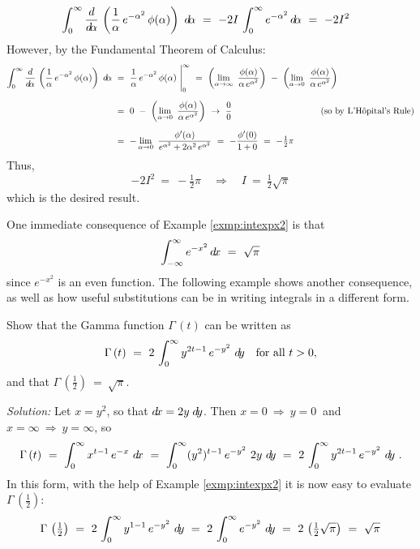 \begin{exmp}
\begin{align*}
&\int_0^{\infty} \frac{d}{d\!\alpha}\,\left(\frac{1}{\alpha}\,e^{-\alpha^2}\,\phi(\alpha)\right)~d\!\alpha ~=~
-2I\,\int_0^{\infty} e^{-\alpha^2} \,d\!\alpha ~=~ -2I^2
\end{align*}
However, by the Fundamental Theorem of Calculus:
\begin{align*}
\int_0^{\infty} \frac{d}{d\!\alpha}\,\left(\frac{1}{\alpha}\,e^{-\alpha^2}\,\phi(\alpha)\right)~d\!\alpha ~&=~
\frac{1}{\alpha}\,e^{-\alpha^2}\,\phi(\alpha)~\Biggr|_0^{\infty}
~=~ \left(\lim_{\alpha \to \infty}~\frac{\phi(\alpha)}{\alpha \,e^{\alpha^2}}\right) ~-~
    \left(\lim_{\alpha \to 0}~\frac{\phi(\alpha)}{\alpha\,e^{\alpha^2}}\right)\\[6pt]
&=~ 0 ~-~ \left(\lim_{\alpha \to 0}~\frac{\phi(\alpha)}{\alpha\,e^{\alpha^2}}\right)
 ~\to~ \frac{0}{0} \qquad\qquad\qquad\qquad\qquad(\text{so by L'H\^{o}pital's Rule})\\[6pt]
&=~ -\lim_{\alpha \to 0}~\frac{\phi'(\alpha)}{e^{\alpha^2} + 2\alpha^2\,e^{\alpha^2}}
~=~ -\frac{\phi'(0)}{1+0} ~=~ -\tfrac{1}{2}\pi
\end{align*}
Thus,
\[
-2I^2 ~=~ -\tfrac{1}{2}\pi \quad\Rightarrow\quad I ~=~ \tfrac{1}{2}\sqrt{\pi}
\]
which is the desired result.
\end{exmp}
\divider
\newpage
One immediate consequence of Example \ref{exmp:intexpx2} is that
\[
\int_{-\infty}^{\infty} e^{-x^2} \,d\!x ~=~ \sqrt{\pi}
\]
since $e^{-x^2}$ is an even function. The following example shows another
consequence, as well as how useful substitutions can be in writing integrals in
a different form.

\begin{exmp}\label{exmp:intgamma1}
\noindent Show that the Gamma function $\Gamma\,(t)$ can be written as
\[
\Gamma\,(t) ~=~ 2\,\int_0^{\infty} y^{2t-1} \, e^{-y^2} ~d\!y \quad\text{for all $t > 0$,}
\]
and that $\Gamma\,\left(\tfrac{1}{2}\right) ~=~ \sqrt{\pi}$.\vspace{1mm}
\par\noindent\emph{Solution:} Let $x = y^2$, so that $d\!x = 2y\;d\!y$. Then
$x=0~\Rightarrow~y=0~$ and $x=\infty~\Rightarrow~y=\infty$, so
\[
\Gamma\,(t) ~=~ \int_0^{\infty} x^{t-1} \, e^{-x} ~d\!x
~=~ \int_0^{\infty} (y^2)^{t-1}\,e^{-y^2}~2y~d\!y\\[6pt]
~=~ 2\,\int_0^{\infty} y^{2t-1} \, e^{-y^2} ~d\!y ~.
\]
In this form, with the help of Example \ref{exmp:intexpx2} it is now easy to
evaluate $\Gamma\,\left(\tfrac{1}{2}\right)$:
\[
\Gamma\,\left(\tfrac{1}{2}\right) ~=~ 2\,\int_0^{\infty} y^{1-1} \, e^{-y^2} ~d\!y ~=~
2\,\int_0^{\infty} e^{-y^2}~d\!y ~=~ 2\,\left(\tfrac{1}{2}\sqrt{\pi}\right) ~=~ \sqrt{\pi}
\]
\end{exmp}
\divider
\vspace{2mm}

